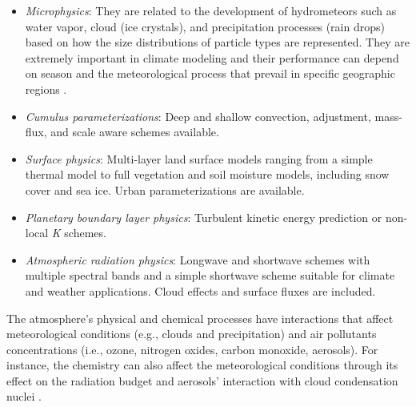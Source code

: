 \begin{itemize}
	\item \textit{Microphysics}: They are related to the development of hydrometeors such as water vapor, cloud (ice crystals), and precipitation processes (rain drops) based on how the size distributions of particle types are represented. They are extremely important in climate modeling and their performance can depend on season and the meteorological process that prevail in specific geographic regions \citep{Warner2011}.
	\item \textit{Cumulus parameterizations}: Deep and shallow convection, adjustment, mass-flux, and scale aware schemes available.
	\item \textit{Surface physics}: Multi-layer land surface models ranging from a simple thermal model to full vegetation and soil moisture models, including snow cover and sea ice. Urban parameterizations are available.
	\item \textit{Planetary boundary layer physics}: Turbulent kinetic energy prediction or non-local \textit{K} schemes.
	\item \textit{Atmospheric radiation physics}: Longwave and shortwave schemes with multiple spectral bands and a simple shortwave scheme suitable for climate and weather applications. Cloud effects and surface fluxes are included.
\end{itemize}

The atmosphere's physical and chemical processes have interactions that affect meteorological conditions (e.g., clouds and precipitation) and air pollutants concentrations (i.e., ozone, nitrogen oxides, carbon monoxide, aerosols).
For instance, the chemistry can also affect the meteorological conditions through its effect on the radiation budget and aerosols' interaction with cloud condensation nuclei \citep{Grell2005}.

